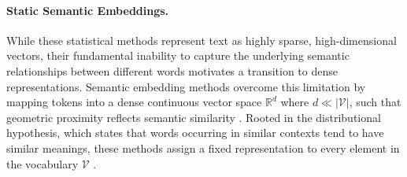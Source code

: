 


\paragraph{Static Semantic Embeddings.}
\label{sec:static_embeddings}

While these statistical methods represent text as highly sparse, high-dimensional vectors, their fundamental inability to capture the underlying semantic relationships between different words motivates a transition to dense representations. Semantic embedding methods overcome this limitation by mapping tokens into a dense continuous vector space $\mathbb{R}^d$ where $d \ll |\mathcal{V}|$, such that geometric proximity reflects semantic similarity \cite{Mikolov2013, Goldberg2017}. Rooted in the distributional hypothesis, which states that words occurring in similar contexts tend to have similar meanings, these methods assign a fixed representation to every element in the vocabulary $\mathcal{V}$ \cite[p. 96 f.]{Jurafsky2024_SLP}. 

